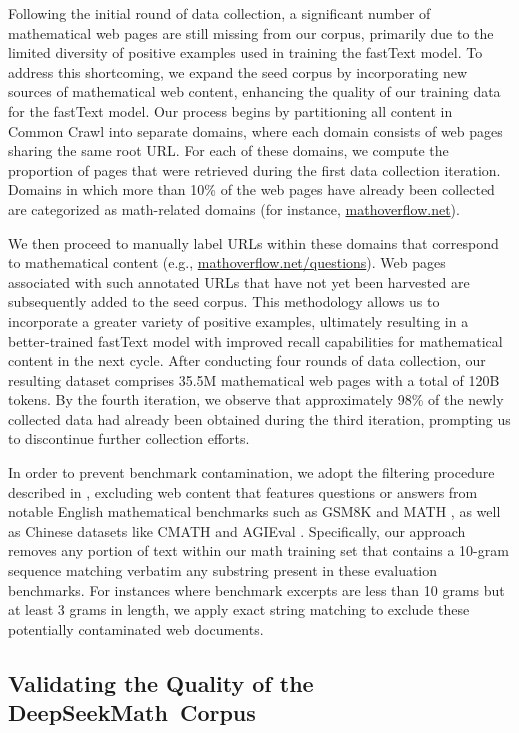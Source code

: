 \begin{itemize}[topsep=0pt]
Following the initial round of data collection, a significant number of mathematical web pages are still missing from our corpus, primarily due to the limited diversity of positive examples used in training the fastText model. To address this shortcoming, we expand the seed corpus by incorporating new sources of mathematical web content, enhancing the quality of our training data for the fastText model. Our process begins by partitioning all content in Common Crawl into separate domains, where each domain consists of web pages sharing the same root URL. For each of these domains, we compute the proportion of pages that were retrieved during the first data collection iteration. Domains in which more than 10\% of the web pages have already been collected are categorized as math-related domains (for instance, \url{mathoverflow.net}). 

We then proceed to manually label URLs within these domains that correspond to mathematical content (e.g., \url{mathoverflow.net/questions}). Web pages associated with such annotated URLs that have not yet been harvested are subsequently added to the seed corpus. This methodology allows us to incorporate a greater variety of positive examples, ultimately resulting in a better-trained fastText model with improved recall capabilities for mathematical content in the next cycle. After conducting four rounds of data collection, our resulting dataset comprises 35.5M mathematical web pages with a total of 120B tokens. By the fourth iteration, we observe that approximately 98\% of the newly collected data had already been obtained during the third iteration, prompting us to discontinue further collection efforts.

In order to prevent benchmark contamination, we adopt the filtering procedure described in \cite{deepseek-coder}, excluding web content that features questions or answers from notable English mathematical benchmarks such as GSM8K \citep{gsm8k} and MATH \citep{MATH}, as well as Chinese datasets like CMATH \citep{wei2023cmath} and AGIEval \citep{agieval}. Specifically, our approach removes any portion of text within our math training set that contains a 10-gram sequence matching verbatim any substring present in these evaluation benchmarks. For instances where benchmark excerpts are less than 10 grams but at least 3 grams in length, we apply exact string matching to exclude these potentially contaminated web documents.

\subsection{Validating the Quality of the DeepSeekMath~Corpus}


\end{itemize}

